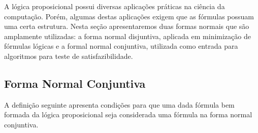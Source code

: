 A lógica proposicional possui diversas aplicações práticas na ciência
da computação. Porém, algumas destas aplicações exigem que as fórmulas
possuam uma certa estrutura. Nesta seção apresentaremos duas formas
normais que são amplamente utilizadas: a forma normal disjuntiva,
aplicada em minimização de fórmulas lógicas e a formal normal
conjuntiva, utilizada como entrada para algoritmos para teste de
satisfazibilidade.

\subsection{Forma Normal Conjuntiva}

A definição seguinte apresenta condições para que uma dada fórmula bem
formada da lógica proposicional seja considerada uma fórmula na forma
normal conjuntiva.

